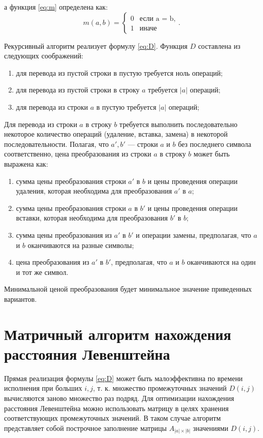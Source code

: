 а функция \ref{eq:m} определена как:
\begin{equation}
	\label{eq:m}
	m(a, b) = \begin{cases}
		0 &\text{если a = b,}\\
		1 &\text{иначе}
	\end{cases}.
\end{equation}

Рекурсивный алгоритм реализует формулу \ref{eq:D}.
Функция $D$ составлена из следующих соображений:
\begin{enumerate}[label={\arabic*)}]
	\item для перевода из пустой строки в пустую требуется ноль операций;
	\item для перевода из пустой строки в строку $a$ требуется $|a|$ операций;
	\item для перевода из строки $a$ в пустую требуется $|a|$ операций;
\end{enumerate}
Для перевода из строки $a$ в строку $b$ требуется выполнить последовательно некоторое количество операций (удаление, вставка, замена) в некоторой последовательности. Полагая, что $a', b'$  — строки $a$ и $b$ без последнего символа соответственно, цена преобразования из строки $a$ в строку $b$ может быть выражена как:
	\begin{enumerate}[label={\arabic*)}]
		\item сумма цены преобразования строки $a'$ в $b$ и цены проведения операции удаления, которая необходима для преобразования $a'$ в $a$;
		\item сумма цены преобразования строки $a$ в $b'$  и цены проведения операции вставки, которая необходима для преобразования $b'$ в $b$;
		\item сумма цены преобразования из $a'$ в $b'$ и операции замены, предполагая, что $a$ и $b$ оканчиваются на разные символы;
		\item цена преобразования из $a'$ в $b'$, предполагая, что $a$ и $b$ оканчиваются на один и тот же символ.
	\end{enumerate}
Минимальной ценой преобразования будет минимальное значение приведенных вариантов.

\section{Матричный алгоритм нахождения расстояния Левенштейна}

Прямая реализация формулы \ref{eq:D} может быть малоэффективна по времени исполнения при больших $i, j$, т. к. множество промежуточных значений $D(i, j)$ вычисляются заново множество раз подряд. Для оптимизации нахождения расстояния Левенштейна можно использовать матрицу в целях хранения соответствующих промежуточных значений. В таком случае алгоритм представляет собой построчное заполнение матрицы 
$A_{|a|\times |b|}$ значениями $D(i, j)$.

